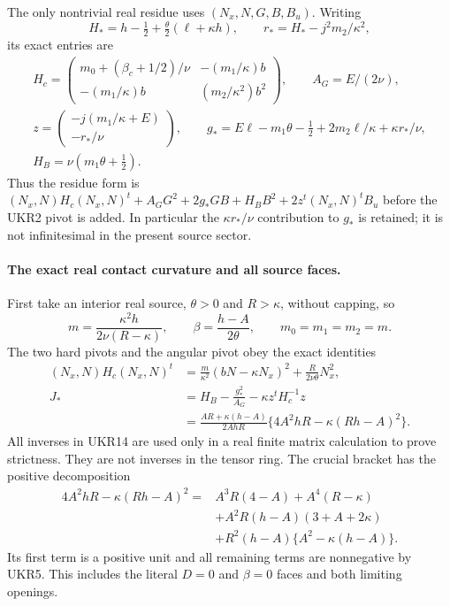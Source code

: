 The only nontrivial real residue uses $(N_x,N,G,B,B_u)$.
Writing
\[
 H_* = h-\tfrac12+\tfrac\theta2(\ell+\kappa h),\qquad
 r_* = H_*-j^2m_2/\kappa^2,
 \tag{UKR11}
\]
its exact entries are
\[
\begin{gathered}
 H_c=\begin{pmatrix}
 m_0+(\beta_c+1/2)/\nu&-(m_1/\kappa)b\\
 -(m_1/\kappa)b&(m_2/\kappa^2)b^2
 \end{pmatrix},\qquad A_G=E/(2\nu),\\
 z=\begin{pmatrix}-j(m_1/\kappa+E)\\-r_*/\nu\end{pmatrix},\qquad
 g_*=E\ell-m_1\theta-\tfrac12+2m_2\ell/\kappa
                                        +\kappa r_*/\nu,\\
 H_B=\nu(m_1\theta+\tfrac12).
\end{gathered}\tag{UKR12}
\]
Thus the residue form is
$ (N_x,N)H_c(N_x,N)^t+A_GG^2+2g_*GB+H_BB^2
 +2z^t(N_x,N)^tB_u$ before the UKR2 pivot is added.
In particular the $\kappa r_*/\nu$ contribution to $g_*$ is
retained; it is not infinitesimal in the present source sector.

\paragraph{The exact real contact curvature and all source faces.}
First take an interior real source, $\theta>0$ and $R>\kappa$,
without capping, so
\[
 m=\frac{\kappa^2h}{2\nu(R-\kappa)},\qquad
 \beta=\frac{h-A}{2\theta},\qquad
 m_0=m_1=m_2=m.
 \tag{UKR13}
\]
The two hard pivots and the angular pivot obey the exact identities
\[
\begin{split}
 (N_x,N)H_c(N_x,N)^t
   &=\frac m{\kappa^2}(bN-\kappa N_x)^2
                                  +\frac R{2\nu\theta}N_x^2,\\
 J_*&=H_B-\frac{g_*^2}{A_G}-\kappa z^tH_c^{-1}z\\
 &=\frac{AR+\kappa(h-A)}{2AhR}
                  \{4A^2hR-\kappa(Rh-A)^2\}.
\end{split}\tag{UKR14}
\]
All inverses in UKR14 are used only in a real finite matrix
calculation to prove strictness. They are not inverses in the
tensor ring. The crucial bracket has the positive decomposition
\[
\begin{split}
4A^2hR-\kappa(Rh-A)^2={}&A^3R(4-A)+A^4(R-\kappa)\\
 &+A^2R(h-A)(3+A+2\kappa)\\
 &+R^2(h-A)\{A^2-\kappa(h-A)\}.
\end{split}\tag{UKR15}
\]
Its first term is a positive unit and all remaining terms are
nonnegative by UKR5. This includes the literal $D=0$ and
$\beta=0$ faces and both limiting openings.

